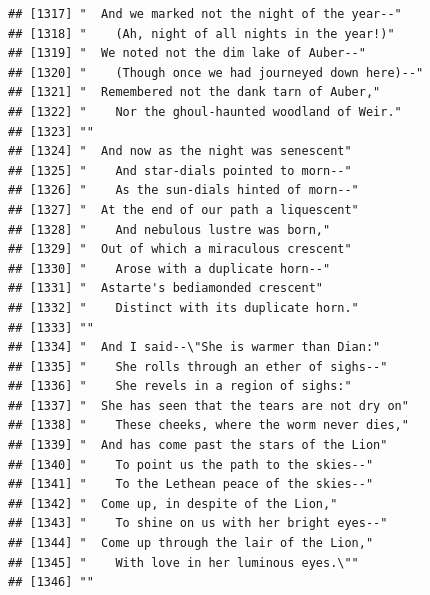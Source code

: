 \documentclass{article}\usepackage[]{graphicx}\usepackage[]{color}
\makeatletter
\newenvironment{kframe}{%
 \def\at@end@of@kframe{}%
 \ifinner\ifhmode%
  \def\at@end@of@kframe{\end{minipage}}%
  \begin{minipage}{\columnwidth}%
 \fi\fi%
 \def\FrameCommand##1{\hskip\@totalleftmargin \hskip-\fboxsep
 \colorbox{shadecolor}{##1}\hskip-\fboxsep
     \hskip-\linewidth \hskip-\@totalleftmargin \hskip\columnwidth}%
 \MakeFramed {\advance\hsize-\width
   \@totalleftmargin\z@ \linewidth\hsize
   \@setminipage}}%
 {\par\unskip\endMakeFramed%
 \at@end@of@kframe}
\newenvironment{knitrout}{}{} %
\makeatother
\begin{document}
\begin{knitrout}
\begin{kframe}
\begin{verbatim}
## [1317] "  And we marked not the night of the year--"                                 
## [1318] "    (Ah, night of all nights in the year!)"                                  
## [1319] "  We noted not the dim lake of Auber--"                                      
## [1320] "    (Though once we had journeyed down here)--"                              
## [1321] "  Remembered not the dank tarn of Auber,"                                    
## [1322] "    Nor the ghoul-haunted woodland of Weir."                                 
## [1323] ""                                                                            
## [1324] "  And now as the night was senescent"                                        
## [1325] "    And star-dials pointed to morn--"                                        
## [1326] "    As the sun-dials hinted of morn--"                                       
## [1327] "  At the end of our path a liquescent"                                       
## [1328] "    And nebulous lustre was born,"                                           
## [1329] "  Out of which a miraculous crescent"                                        
## [1330] "    Arose with a duplicate horn--"                                           
## [1331] "  Astarte's bediamonded crescent"                                            
## [1332] "    Distinct with its duplicate horn."                                       
## [1333] ""                                                                            
## [1334] "  And I said--\"She is warmer than Dian:"                                    
## [1335] "    She rolls through an ether of sighs--"                                   
## [1336] "    She revels in a region of sighs:"                                        
## [1337] "  She has seen that the tears are not dry on"                                
## [1338] "    These cheeks, where the worm never dies,"                                
## [1339] "  And has come past the stars of the Lion"                                   
## [1340] "    To point us the path to the skies--"                                     
## [1341] "    To the Lethean peace of the skies--"                                     
## [1342] "  Come up, in despite of the Lion,"                                          
## [1343] "    To shine on us with her bright eyes--"                                   
## [1344] "  Come up through the lair of the Lion,"                                     
## [1345] "    With love in her luminous eyes.\""                                       
## [1346] ""                                                                            

\end{verbatim}
\end{kframe}
\end{knitrout}
\end{document}
